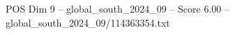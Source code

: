 \begin{textsample}{POS Dim 9 – global\_south\_2024\_09 – Score 6.00 – global\_south\_2024\_09/114363354.txt}
\end{textsample}
